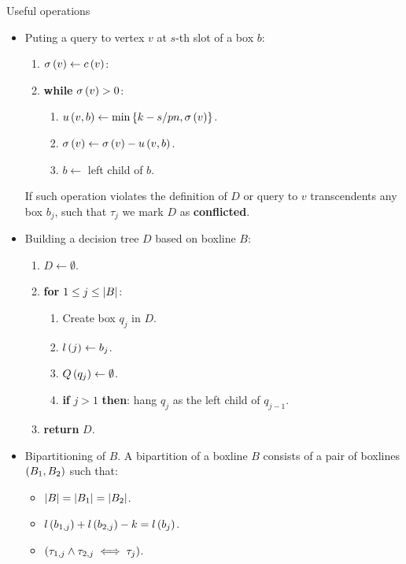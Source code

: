 \begin{frame}[allowframebreaks]{Useful operations}
\begin{itemize}
    \item Puting a query to vertex $v$ at $s$-th slot of a box $b$:
    \begin{enumerate}
        \item $\sigma\left( v \right)\gets c\left( v \right)$: 
        \item \textbf{while} $\sigma\left( v \right)>0$: 
        \begin{enumerate}
            \item $u\left( v, b \right)\gets\min\left\{ k-s/pn, \sigma\left( v \right) \right\}$.
            \item $\sigma\left( v \right)\gets \sigma\left( v \right)-u\left( v, b \right)$. 
            \item $b\gets$ left child of $b$.
        \end{enumerate}
    \end{enumerate} If such operation violates the definition of $D$ or query to $v$ transcendents any box $b_j$, such that $\tau_j$ we mark $D$ as \textbf{conflicted}. 
    \framebreak
    \item Building a decision tree $D$ based on boxline $B$:
    \begin{enumerate}
        \item $D\gets\emptyset$.
        \item \textbf{for} $1\leq j\leq \left| B \right|$:
        \begin{enumerate}
            \item Create box $q_j$ in $D$.
            \item $l\left( j \right)\gets b_j$.
            \item $Q\left( q_j \right)\gets\emptyset$.
            \item \textbf{if} $j>1$ \textbf{then}: hang $q_j$ as the left child of $q_{j-1}$.
        \end{enumerate}
        \item \textbf{return} $D$.
    \end{enumerate} 
    \item Bipartitioning of $B$. A bipartition of a boxline $B$ consists of a pair of boxlines $\left( B_1,B_2 \right)$ such that:
    \begin{itemize}
        \item $\left| B \right|=\left| B_1 \right|=\left| B_2 \right|$.
        \item $l\left( b_{1,j} \right)+l\left( b_{2,j} \right) - k = l\left( b_j \right)$.
        \item $\left( \tau_{1,j}\land \tau_{2,j} \iff \tau_{j} \right)$.

\end{itemize}
\end{itemize}
\end{frame}
